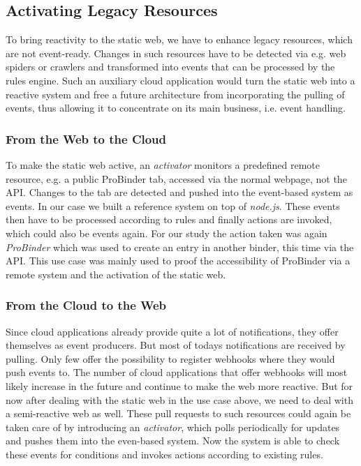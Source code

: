 \documentclass[11pt]{article}%
\begin{document}
\subsection{Activating Legacy Resources}
To bring reactivity to the static web, we have to enhance legacy resources, which are not event-ready. Changes in such resources have to be detected via e.g. web spiders or crawlers and transformed into events that can be processed by the rules engine. Such an auxiliary cloud application would turn the static web into a reactive system and free a future architecture from incorporating the pulling of events, thus allowing it to concentrate on its main business, i.e. event handling.

\subsubsection{From the Web to the Cloud}
To make the static web active, an \emph{activator} monitors a predefined remote resource, e.g. a public ProBinder tab, accessed via the normal webpage, not the API. Changes to the tab are detected and pushed into the event-based system as events. In our case we built a reference system on top of \emph{node.js}. These events then have to be processed according to rules and finally actions are invoked, which could also be events again. For our study the action taken was again \emph{ProBinder} which was used to create an entry in another binder, this time via the API. This use case was mainly used to proof the accessibility of ProBinder via a remote system and the activation of the static web.

\subsubsection{From the Cloud to the Web}
Since cloud applications already provide quite a lot of notifications, they offer themselves as event producers. But most of todays notifications are received by pulling. Only few offer the possibility to register webhooks where they would push events to. The number of cloud applications that offer webhooks will most likely increase in the future and continue to make the web more reactive. But for now after dealing with the static web in the use case above, we need to deal with a semi-reactive web as well. These pull requests to such resources could again be taken care of by introducing an \emph{activator}, which polls periodically for updates and pushes them into the even-based system. 
Now the system is able to check these events for conditions and invokes actions according to existing rules.
\end{document}
